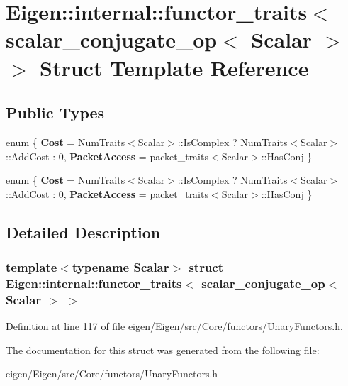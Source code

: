 \hypertarget{struct_eigen_1_1internal_1_1functor__traits_3_01scalar__conjugate__op_3_01_scalar_01_4_01_4}{}\section{Eigen\+:\+:internal\+:\+:functor\+\_\+traits$<$ scalar\+\_\+conjugate\+\_\+op$<$ Scalar $>$ $>$ Struct Template Reference}
\label{struct_eigen_1_1internal_1_1functor__traits_3_01scalar__conjugate__op_3_01_scalar_01_4_01_4}
\subsection*{Public Types}
\begin{DoxyCompactItemize}
\item 
\mbox{\label{struct_eigen_1_1internal_1_1functor__traits_3_01scalar__conjugate__op_3_01_scalar_01_4_01_4_a2857e3ffebc8f7ee981a870ac95aafb2}} 
enum \{ {\bfseries Cost} = Num\+Traits$<$Scalar$>$\+:\+:Is\+Complex ? Num\+Traits$<$Scalar$>$\+:\+:Add\+Cost \+: 0, 
{\bfseries Packet\+Access} = packet\+\_\+traits$<$Scalar$>$\+:\+:Has\+Conj
 \}
\item 
\mbox{\label{struct_eigen_1_1internal_1_1functor__traits_3_01scalar__conjugate__op_3_01_scalar_01_4_01_4_a322b7ef8412ea83681eee8ca8f5c3bb9}} 
enum \{ {\bfseries Cost} = Num\+Traits$<$Scalar$>$\+:\+:Is\+Complex ? Num\+Traits$<$Scalar$>$\+:\+:Add\+Cost \+: 0, 
{\bfseries Packet\+Access} = packet\+\_\+traits$<$Scalar$>$\+:\+:Has\+Conj
 \}
\end{DoxyCompactItemize}


\subsection{Detailed Description}
\subsubsection*{template$<$typename Scalar$>$\newline
struct Eigen\+::internal\+::functor\+\_\+traits$<$ scalar\+\_\+conjugate\+\_\+op$<$ Scalar $>$ $>$}



Definition at line \hyperlink{eigen_2_eigen_2src_2_core_2functors_2_unary_functors_8h_source_l00117}{117} of file \hyperlink{eigen_2_eigen_2src_2_core_2functors_2_unary_functors_8h_source}{eigen/\+Eigen/src/\+Core/functors/\+Unary\+Functors.\+h}.



The documentation for this struct was generated from the following file\+:\begin{DoxyCompactItemize}
\item 
eigen/\+Eigen/src/\+Core/functors/\+Unary\+Functors.\+h\end{DoxyCompactItemize}
